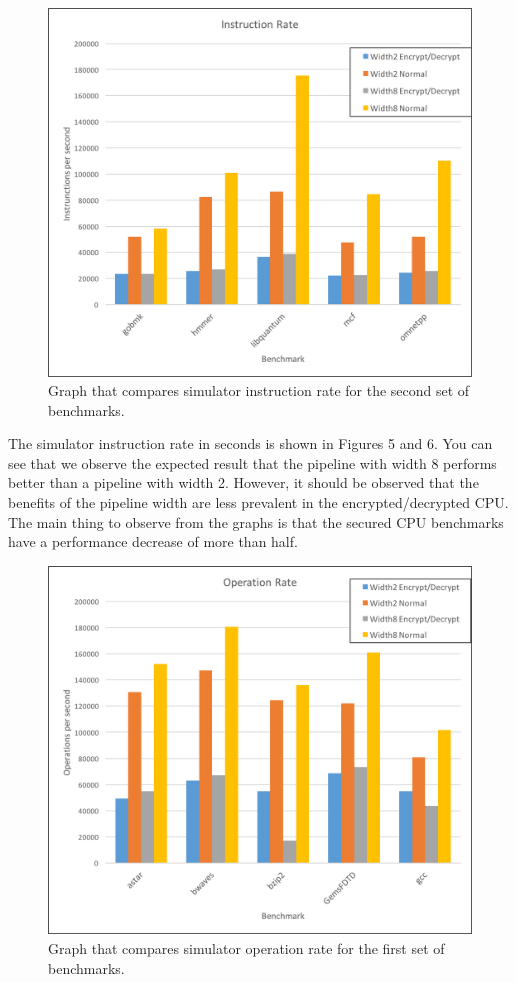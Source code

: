 \documentclass[letterpaper, 10pt, conference]{ieeeconf}  %
\begin{document}
\begin{figure}[thpb]
	\centering
	\includegraphics[scale=.45]{InstructionRate2}
   \caption{Graph that compares simulator instruction rate for the second set of benchmarks.}
\end{figure}

The simulator instruction rate in seconds is shown in Figures 5 and 6.  You can see that we observe the expected result that the pipeline with width 8 performs better than a pipeline with width 2.  However, it should be observed that the benefits of the pipeline width are less prevalent in the encrypted/decrypted CPU.  The main thing to observe from the graphs is that the secured CPU benchmarks have a performance decrease of more than half.

\begin{figure}[thpb]
	\centering
	\includegraphics[scale=.45]{OperationsRate1}
   \caption{Graph that compares simulator operation rate for the first set of benchmarks.}
\end{figure}
\end{document}
